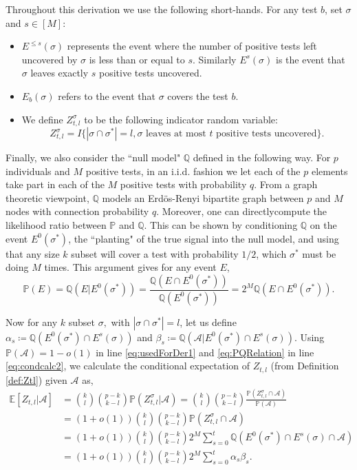 \documentclass[12pt,reqno]{amsart}
\numberwithin{equation}{section}
\theoremstyle{definition}
\newcommand{\E}{\mathbb{E}}
\newcommand{\Q}{\mathbb{Q}}
\renewcommand{\P}{\mathbb{P}}
\renewcommand{\[}{\begin{equation}}
\renewcommand{\]}{\end{equation}}
\newcommand{\scr}{\mathcal}
\renewcommand{\|}{\bigg{|}}
\begin{document}
Throughout this derivation we use the following short-hands. For any test $b$, set $\sigma$ and $s \in [M]$:
\begin{itemize}
    \item[(a)] $E^{\leq s}(\sigma)$ represents the event where the number of positive tests left uncovered by $\sigma$ is less than or equal to $s$. Similarly $E^{s}(\sigma)$ is the event that $\sigma$ leaves exactly $s$ positive tests uncovered.
    \item[(b)] $E_b(\sigma)$ refers to the event that $\sigma$ covers the test $b$. 
    \item[(c)] We define $Z^\sigma_{t,l}$ to be the following indicator random variable:
        \[Z^\sigma_{t,l} = I\{|\sigma \cap \sigma^*| = l, \sigma \text{ leaves at most }t\text{ positive tests uncovered}\}.\]
\end{itemize}
 Finally, we also consider the ``null model" $\Q$ defined in the following way. For $p$ individuals and $M$ positive tests, in an i.i.d. fashion we let each of the $p$ elements take part in each of the $M$ positive tests with probability $q.$ From a graph theoretic viewpoint, $\Q$ models an Erd\"os-Renyi bipartite graph between $p$ and $M$ nodes with connection probability $q$. Moreover, one can directlycompute the likelihood ratio between $\P$ and $\Q$. This can be shown by conditioning $\Q$ on the event $E^0(\sigma^*)$, the ``planting" of the true signal into the null model, and using that any size $k$ subset will cover a test with probability $1/2$, which $\sigma^*$ must be doing $M$ times. This argument gives for any event $E$,
\[
    \P(E) = \Q(E | E^0(\sigma^*)) = \frac{\Q(E \cap E^0(\sigma^*))}{\Q(E^0(\sigma^*))} = 2^M \Q(E \cap E^0(\sigma^*)).\label{eq:PQRelation}
\]

Now for any $k$ subset $\sigma,$ with $ |\sigma \cap \sigma^*|=l$, let us define $\alpha_s \coloneqq \Q(E^0(\sigma^*) \cap E^s(\sigma) )$ and $\beta_s \coloneqq \Q(\scr{A}|E^0(\sigma^*) \cap E^{s}(\sigma) )$. 
Using $\P({\scr{A}}) = 1-o(1)$ in line \eqref{eq:usedForDer1} and \eqref{eq:PQRelation} in line \eqref{eq:condcalc2}, we calculate the conditional expectation of $Z_{t,l}$ (from Definition \ref{def:Ztl}) given $\scr{A}$ as,
\begin{align}
	\E[Z_{t,l}|\scr{A}] &= \binom{k}{l} \binom{p - k}{k-l} \P(Z^\sigma_{t,l}|\scr{A}) = \binom{k}{l} \binom{p - k}{k-l} \frac{\P(Z^\sigma_{t,l}\cap \scr{A})}{\P(\scr{A})} \\
 &= (1+o(1)) \binom{k}{l} \binom{p - k}{k-l} \P(Z^\sigma_{t,l}\cap \scr{A})\label{eq:usedForDer1}\\
	&= (1+o(1))\binom{k}{l} \binom{p - k}{k-l}  2^M\sum_{s = 0}^t \Q(E^0(\sigma^*) \cap E^{s}(\sigma) \cap \scr{A})\label{eq:condcalc2}\\
 &= (1+o(1))\binom{k}{l} \binom{p - k}{k-l}  2^M\sum_{s = 0}^t \alpha_s \beta_s.\label{eq:origionalEbound}
\end{align}
\end{document}
